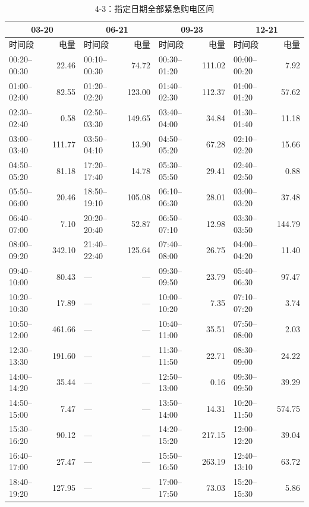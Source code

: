 \FloatBarrier
\begin{table}[htbp]\centering\scriptsize
\caption{4-3：指定日期全部紧急购电区间}
\setlength{\tabcolsep}{3pt}\begin{tabular}{lrlrlrlr}\toprule
\multicolumn{2}{c}{03-20} & \multicolumn{2}{c}{06-21} & \multicolumn{2}{c}{09-23} & \multicolumn{2}{c}{12-21}\\\midrule
时间段 & 电量 & 时间段 & 电量 & 时间段 & 电量 & 时间段 & 电量\\
00:20--00:30 & 22.46 & 00:10--00:30 & 74.72 & 00:30--01:20 & 111.02 & 00:00--00:20 & 7.92\\
01:00--02:00 & 82.55 & 01:20--02:20 & 123.00 & 01:40--02:30 & 112.37 & 01:00--01:20 & 57.62\\
02:30--02:40 & 0.58 & 02:50--03:30 & 149.65 & 03:40--04:00 & 34.84 & 01:30--01:40 & 11.18\\
03:00--03:40 & 111.77 & 03:50--04:10 & 13.90 & 04:50--05:20 & 67.28 & 02:10--02:20 & 15.66\\
04:50--05:20 & 81.18 & 17:20--17:40 & 14.78 & 05:30--05:50 & 29.41 & 02:40--02:50 & 0.88\\
05:50--06:00 & 20.46 & 18:50--19:10 & 105.08 & 06:10--06:30 & 28.01 & 03:00--03:20 & 37.48\\
06:40--07:00 & 7.10 & 20:20--20:40 & 52.87 & 06:50--07:10 & 12.98 & 03:30--03:50 & 144.79\\
08:00--09:20 & 342.10 & 21:40--22:40 & 125.64 & 07:40--08:00 & 26.75 & 04:00--04:20 & 11.40\\
09:40--10:00 & 80.43 & — & — & 09:30--09:50 & 23.79 & 05:40--06:30 & 97.47\\
10:20--10:30 & 17.89 & — & — & 10:00--10:20 & 7.35 & 07:10--07:20 & 3.74\\
10:50--12:00 & 461.66 & — & — & 10:40--11:00 & 35.51 & 07:50--08:00 & 2.03\\
12:30--13:30 & 191.60 & — & — & 11:30--11:50 & 22.71 & 08:30--09:00 & 24.22\\
14:00--14:20 & 35.44 & — & — & 12:50--13:00 & 0.16 & 09:30--09:50 & 39.29\\
14:50--15:00 & 7.47 & — & — & 13:50--14:00 & 14.31 & 10:20--11:50 & 574.75\\
15:30--16:20 & 90.12 & — & — & 14:20--15:20 & 217.15 & 12:00--12:20 & 39.04\\
16:40--17:00 & 27.47 & — & — & 15:50--16:50 & 263.19 & 12:40--13:10 & 63.72\\
18:40--19:20 & 127.95 & — & — & 17:00--17:50 & 73.03 & 15:20--15:30 & 5.86\\

\end{tabular}
\end{table}
